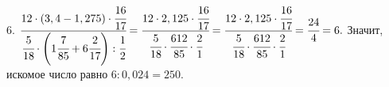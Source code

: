6. $\cfrac{12\cdot(3,4-1,275)\cdot\cfrac{16}{17}}{\cfrac{5}{18}\cdot\left(1\cfrac{7}{85}
+6\cfrac{2}{17}\right):\cfrac{1}{2}}=\cfrac{12\cdot2,125\cdot\cfrac{16}{17}}{\cfrac{5}{18}\cdot\cfrac{612}{85}\cdot\cfrac{2}{1}}=
\cfrac{12\cdot2,125\cdot\cfrac{16}{17}}{\cfrac{5}{18}\cdot\cfrac{612}{85}\cdot\cfrac{2}{1}}=\cfrac{24}{4}=6.$ Значит, искомое число равно $6:0,024=250.$\\
